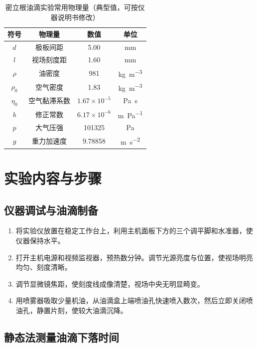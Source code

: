 \documentclass[a4paper,8pt,twocolumn]{article}
\begin{document}
\begin{table}[H]
\centering
\caption{密立根油滴实验常用物理量（典型值，可按仪器说明书修改）}
\begin{tabular}{cccc}
\toprule
符号 & 物理量 & 数值 & 单位 \\
\midrule
$d$ & 极板间距 & 5.00 & \si{\milli\meter} \\
$l$ & 视场刻度距 & 1.60 & \si{\milli\meter} \\
$\rho$ & 油密度 & 981 & \si{\kilo\gram\per\meter\cubed} \\
$\rho_0$ & 空气密度 & 1.83 & \si{\kilo\gram\per\meter\cubed} \\
$\eta_0$ & 空气黏滞系数 & $1.67\times10^{-5}$ & \si{\pascal\second} \\
$b$ & 修正常数 & $6.17\times10^{-6}$ & \si{\meter\per\pascal} \\
$p$ & 大气压强 & 101325 & \si{\pascal} \\
$g$ & 重力加速度 & 9.78858 & \si{\meter\per\second\squared} \\
\bottomrule
\end{tabular}
\end{table}

\section{实验内容与步骤}

\subsection{仪器调试与油滴制备}

\begin{enumerate}[label=\arabic*)]
  \item 将实验仪放置在稳定工作台上，利用主机面板下方的三个调平脚和水准器，使仪器保持水平。
  \item 打开主机电源和视频监视器，预热数分钟。调节光源亮度与位置，使视场明亮均匀、刻度清晰。
  \item 调节显微镜焦距，使刻度线成像清楚，视场中央无明显畸变。
  \item 用喷雾器吸取少量机油，从油滴盒上端喷油孔快速喷入数次，然后立即关闭喷油孔，静置片刻，使较大油滴沉降。
\end{enumerate}

\subsection{静态法测量油滴下落时间}
\end{document}
